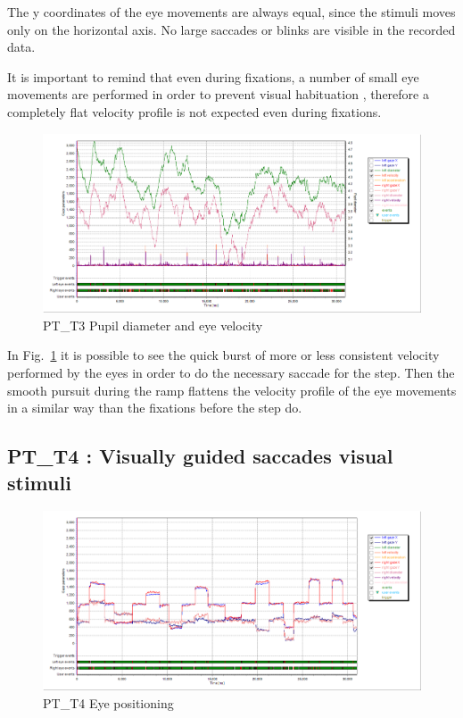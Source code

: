 The y coordinates of the eye movements are always equal, since the stimuli moves only on the horizontal axis. No large saccades or blinks are visible in the recorded data.

It is important to remind that even during fixations, a number of small eye movements are performed in order to prevent visual habituation \citep[p. 3]{leigh2015neurology}, therefore a completely flat velocity profile is not expected even during fixations.

\begin{figure}[h]
  \centering
  \includegraphics[width=.8\textwidth]{figures/graphs/PT_T3(stepRamp)_VP.png}
  \caption[PT\_T3 pupil velocity]{PT\_T3 Pupil diameter and eye velocity}
  \label{fig:PT_T3_vel}
\end{figure}

In Fig.~\ref{fig:PT_T3_vel} it is possible to see the quick burst of more or less consistent velocity performed by the eyes in order to do the necessary saccade for the step. Then the smooth pursuit during the ramp flattens the velocity profile of the eye movements in a similar way than the fixations before the step do.


\subsection{PT\_T4 : Visually guided saccades visual stimuli}
\label{sec:PT_T4}

\begin{figure}[h]
  \centering
  \includegraphics[width=.8\textwidth]{figures/graphs/PT_T4(saccades)_XY.png}
  \caption[PT\_T4 Eye positioning]{PT\_T4 Eye positioning}
  \label{fig:PT_T4_pos}
\end{figure}

